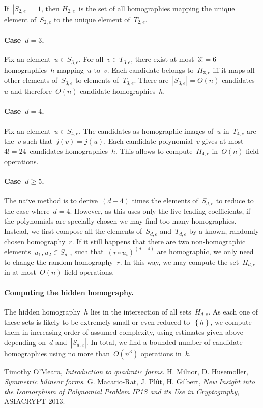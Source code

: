 \documentclass{article}%
\def\acco#1{\left\{#1\right\}}
\def\abs#1{\left|#1\right|}
\def\card#1{\abs{#1}}
\begin{document}
If~$\card{S_{2,e}} = 1$, then $H_{2,e}$~is the set of all homographies
mapping the unique element of~$S_{2,e}$ to the unique element
of~$T_{2,e}$.

\paragraph{Case~$d = 3$.}
Fix an element~$u ∈ S_{3,e}$. For all~$v ∈ T_{3,e}$, there exist at
most~$3! = 6$ homographies~$h$ mapping~$u$ to~$v$. Each candidate belongs
to~$H_{3,e}$ iff it maps all other elements of~$S_{3,e}$ to elements
of~$T_{3,e}$. There are~$\card{S_{3,e}} = O(n)$ candidates~$u$ and
therefore~$O(n)$ candidate homographies~$h$.

\paragraph{Case~$d = 4$.}
Fix an element~$u ∈ S_{4,e}$. The candidates as homographic images of~$u$
in~$T_{4,e}$ are the~$v$ such that~$j(v) = j(u)$. Each candidate
polynomial~$v$ gives at most $4! = 24$~candidates homographies~$h$. This
allows to compute~$H_{4,e}$ in~$O(n)$ field operations.

\paragraph{Case~$d ≥ 5$.} The naïve method is to derive~$(d-4)$ times the
elements of~$S_{d,e}$ to reduce to the case where~$d = 4$. However, as
this uses only the five leading coefficients, if the polynomials are
specially chosen we may find too many homographies. Instead, we first
compose all the elements of~$S_{d,e}$ and~$T_{d,e}$ by a known, randomly
chosen homography~$r$. If it still happens that there are two
non-homographic elements~$u_1, u_2 ∈ S_{d,e}$ such that~$(r ∘
u_i)^{(d-4)}$ are homographic, we only need to change the random
homography~$r$. In this way, we may compute the set~$H_{d,e}$ in at
most~$O(n)$ field operations.

\paragraph{Computing the hidden homography.}

The hidden homography~$h$ lies in the intersection of all sets~$H_{d,e}$.
As each one of these sets is likely to be extremely small or even reduced
to~$\acco{h}$, we compute them in increasing order of assumed complexity,
using estimates given above depending on~$d$ and~$\card{S_{d,e}}$. In
total, we find a bounded number of candidate homographies using no more
than~$O(n^3)$ operations in~$k$.


\begin{thebibliography}{99}%
 Timothy O'Meara, \emph{Introduction to quadratic forms}.
 H. Milnor, D. Husemoller, \emph{Symmetric
bilinear forms}.  G. Macario-Rat, J. Plût, H. Gilbert,
\emph{New Insight into the Isomorphism of Polynomial Problem IP1S and its
Use in Cryptography}, ASIACRYPT 2013.
\end{thebibliography}%
\end{document}
